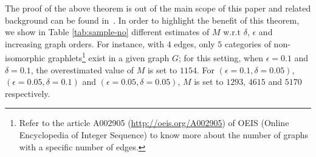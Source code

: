 \documentclass[journal]{IEEEtran}
\theoremstyle{definition}
\newcommand{\tab}[1]{Table \ref{#1}}
\newcommand{\thm}[1]{Theorem~\ref{#1}}
\begin{document}
\begin{table}[!htbp]
\begin{center}
\caption{Sample complexity bounds according to~\thm{thm:sample-compl} for graphlets with orders ranging from $1$ to $10$ and for different settings of $\epsilon$ and $\delta$.}
\label{tab:sample-no}
\end{center}
\end{table}
\noindent The proof of the above theorem is out of the main scope of this paper and related background can be found in~\cite{Weissman2003,Shervashidze2009}. In order to highlight the benefit of this theorem, we show in \tab{tab:sample-no} different estimates of $M$ w.r.t $\delta$, $\epsilon$ and increasing graph orders. For instance, with $4$ edges, only $5$ categories of non-isomorphic graphlets\footnote{Refer to the article A002905 (\url{http://oeis.org/A002905}) of OEIS (Online Encyclopedia of Integer Sequence) to know more about the number of graphs with a specific number of edges.} exist in a given graph $G$; for this setting, when $\epsilon=0.1$ and $\delta=0.1$, the overestimated value of $M$ is set to $1154$. For $(\epsilon=0.1,\delta=0.05)$, $(\epsilon=0.05,\delta=0.1)$ and $(\epsilon=0.05,\delta=0.05)$, $M$ is set to $1293$, $4615$ and $5170$ respectively.
\end{document}
